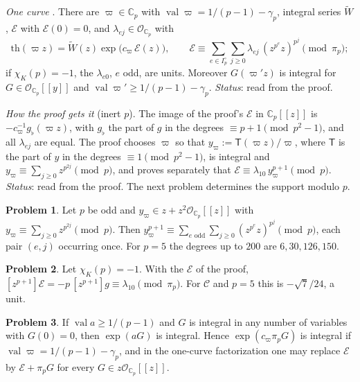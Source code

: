 \documentclass[reqno]{amsart}
\theoremstyle{plain}
\theoremstyle{definition}
\newtheorem{problem}{Problem}[section]
\theoremstyle{remark}
\newcommand{\C}{\mathbb{C}}
\newcommand{\Op}{\mathcal{O}_{\C_p}}
\newcommand{\val}{\operatorname{val}}
\newcommand{\Ec}{\mathcal{E}}
\newcommand{\cv}{c_\varpi}
\newcommand{\tth}{\mathrm{th}}
\begin{document}
\emph{One curve} \cite{GL}.  There are \(\varpi \in \C_p\) with \(\val\varpi = 1/(p-1) - \gamma_p\), integral series \(\widetilde W\), \(\Ec\) with \(\Ec(0) = 0\), and \(\lambda_{ej} \in \Op\) with
\[
  \tth(\varpi z) = \widetilde W(z)\exp\bigl(\cv\,\Ec(z)\bigr), \qquad
  \Ec \equiv \sum_{e \in I_p^\circ}\sum_{j \ge 0} \lambda_{ej}\,(z^{p^e} z)^{p^j} \pmod{\pi_p};
\]
if \(\chi_K(p) = -1\), the \(\lambda_{e0}\), \(e\) odd, are units.  Moreover \(G(\varpi' z)\) is integral for \(G \in \Op[[y]]\) and \(\val\varpi' \ge 1/(p-1) - \gamma_p\).  \emph{Status}: read from the proof.

\emph{How the proof gets it} (inert \(p\)).  The image of the proof's \(\Ec\) in \(\C_p[[z]]\) is \(-\cv^{-1} g_\flat(\varpi z)\), with \(g_\flat\) the part of \(g\) in the degrees \(\equiv p+1 \pmod{p^2-1}\), and all \(\lambda_{ej}\) are equal.  The proof chooses \(\varpi\) so that \(y_\varpi := \mathsf T(\varpi z)/\varpi\), where \(\mathsf T\) is the part of \(y\) in the degrees \(\equiv 1 \pmod{p^2-1}\), is integral and \(y_\varpi \equiv \sum_{j \ge 0} z^{p^{2j}} \pmod p\), and proves separately that \(\Ec \equiv \lambda_{10}\, y_\varpi^{p+1} \pmod p\).  \emph{Status}: read from the proof.  The next problem determines the support modulo \(p\).

\begin{problem}\label{pr:support}
Let \(p\) be odd and \(y_\varpi \in z + z^2\Op[[z]]\) with \(y_\varpi \equiv \sum_{j \ge 0} z^{p^{2j}} \pmod p\).  Then \(y_\varpi^{p+1} \equiv \sum_{e \text{ odd}} \sum_{j \ge 0} (z^{p^e}z)^{p^j} \pmod p\), each pair \((e, j)\) occurring once.  For \(p = 5\) the degrees up to \(200\) are \(6, 30, 126, 150\).
\end{problem}

\begin{problem}\label{pr:first-coefficient}
Let \(\chi_K(p) = -1\).  With the \(\Ec\) of the proof, \([z^{p+1}]\Ec = -p\,[z^{p+1}]g \equiv \lambda_{10} \pmod{\pi_p}\).  For \(\mathcal C\) and \(p = 5\) this is \(-\sqrt7/24\), a unit.
\end{problem}

\begin{problem}\label{pr:absorb}
If \(\val a \ge 1/(p-1)\) and \(G\) is integral in any number of variables with \(G(0) = 0\), then \(\exp(aG)\) is integral.  Hence \(\exp(\cv\pi_p G)\) is integral if \(\val\varpi = 1/(p-1) - \gamma_p\), and in the one-curve factorization one may replace \(\Ec\) by \(\Ec + \pi_p G\) for every \(G \in z\Op[[z]]\).
\end{problem}
\end{document}
